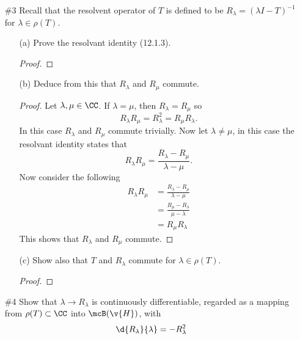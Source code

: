 \documentclass[11pt, oneside]{article}
\begin{document}
\begin{enumerate}
  \item[\#3]
    Recall that the resolvent operator of $T$ is defined to be
    $R_{\lambda} = (\lambda I - T)^{-1}$ for $\lambda \in \rho(T)$.
    \begin{enumerate}
      \item[(a)]
        Prove the resolvant identity (12.1.3).

        \begin{proof}
          
        \end{proof}

      \item[(b)] %
        Deduce from this that $R_{\lambda}$ and $R_{\mu}$ commute.

        \begin{proof}
          Let $\lambda, \mu \in \CC$.
          If $\lambda = \mu$, then $R_{\lambda} = R_{\mu}$ so
          \[
            R_{\lambda} R_{\mu} = R_{\lambda}^2 = R_{\mu} R_{\lambda}.
          \]
          In this case $R_{\lambda}$ and $R_{\mu}$ commute trivially.
          Now let $\lambda \neq \mu$, in this case the resolvant identity
          states that
          \[
            R_{\lambda} R_{\mu} = \frac{R_{\lambda} - R_{\mu}}{\lambda - \mu}.
          \]
          Now consider the following
          \begin{align*}
            R_{\lambda} R_{\mu} &= \frac{R_{\lambda} - R_{\mu}}{\lambda - \mu} \\
            &= \frac{R_{\mu} - R_{\lambda}}{\mu - \lambda} \\
            &= R_{\mu} R_{\lambda}
          \end{align*}
          This shows that $R_{\lambda}$ and $R_{\mu}$ commute.
        \end{proof}

      \item[(c)]
        Show also that $T$ and $R_{\lambda}$ commute for $\lambda \in \rho(T)$.

        \begin{proof}
          
        \end{proof}
    \end{enumerate}

  \pagebreak
  \item[\#4] %
    Show that $\lambda \to R_{\lambda}$ is continuously differentiable, regarded
    as a mapping from $\rho(T) \subset \CC$ into $\mcB(\v{H})$, with
    \[
      \d{R_{\lambda}}{\lambda} = -R_{\lambda}^2
    \]


\end{enumerate}
\end{document}
